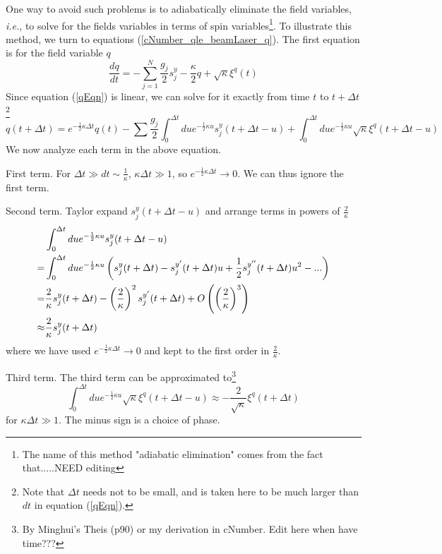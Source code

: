 \documentclass{article}
\begin{document}
One way to avoid such problems is to adiabatically eliminate the field variables, \textit{i.e.}, to solve for the fields variables in terms of spin variables\footnote{The name of this method "adiabatic elimination" comes from the fact that.....NEED editing}. To illustrate this method, we turn to equations (\ref{cNumber_qle_beamLaser_q}). The first equation is for the field variable $q$
\begin{equation}
     \label{qEqn}
     \frac{dq}{dt} = -\sum_{j=1}^N\frac{g_j}{2}s_j^y-\frac{\kappa}{2}q+\sqrt{\kappa}\xi^q(t)
\end{equation}
Since equation (\ref{qEqn}) is linear, we can solve for it exactly from time $t$ to $t+\Delta t$\footnote{Note that $\Delta t$ needs not to be small, and is taken here to be much larger than $dt$ in equation (\ref{qEqn}).}
\begin{equation}
\label{qEqn2}
    q(t+\Delta t) = e^{-\frac{1}{2}\kappa \Delta t}q(t)-\sum\frac{g_j}{2}\int_0^{\Delta t} du e^{-\frac{1}{2}\kappa u}s_j^y(t+\Delta t-u)+\int_0^{\Delta t} du e^{-\frac{1}{2}\kappa u} \sqrt{\kappa}\xi^q(t+\Delta t-u)
\end{equation}
We now analyze each term in the above equation.

First term. For $\Delta t \gg dt \sim \frac{1}{\kappa}$, $\kappa \Delta t \gg 1$, so $e^{-\frac{1}{2}\kappa \Delta t}\rightarrow 0$. We can thus ignore the first term.

Second term. Taylor expand $s_j^y(t+\Delta t -u)$ and arrange terms in powers of $\frac{2}{\kappa}$
\begin{align}
\label{jMinusEli}
    \notag &\int_0^{\Delta t} du e^{-\frac{1}{2}\kappa u}s_j^y(t+\Delta t-u)\\
    \notag=&\int_0^{\Delta t} du e^{-\frac{1}{2}\kappa u}\left(s_j^y(t+\Delta t)-s_j^{y'}(t+\Delta t)u+\frac{1}{2}s_j^{y''}(t+\Delta t)u^2-...\right)\\
    \notag=&\frac{2}{\kappa}s_j^y(t+\Delta t)-\left(\frac{2}{\kappa}\right)^2s_j^{y'}(t+\Delta t)+O\left(\left(\frac{2}{\kappa}\right)^3\right)\\
          \approx&\frac{2}{\kappa}s_j^y(t+\Delta t)
\end{align}
where we have used $e^{-\frac{1}{2}\kappa \Delta t}\rightarrow 0$ and kept to the first order in $\frac{2}{\kappa}$.

Third term. The third term can be approximated to\footnote{By Minghui's Theis (p90) or my derivation in cNumber. Edit here when have time???}
\begin{equation}
   \int_0^{\Delta t} du e^{-\frac{1}{2}\kappa u} \sqrt{\kappa}\xi^q(t+\Delta t-u)\approx-\frac{2}{\sqrt{\kappa}}\xi^q(t+\Delta t)
\end{equation}
for $\kappa \Delta t \gg 1$. The minus sign is a choice of phase.
\end{document}
